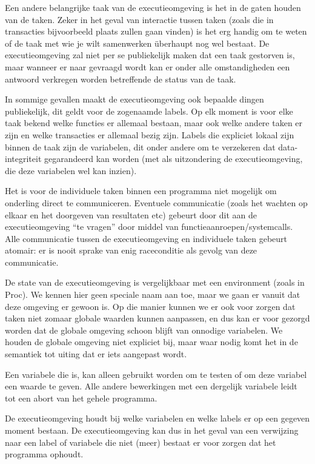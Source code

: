 Een andere belangrijke taak van de executieomgeving is het in de gaten houden van de taken. Zeker in het geval van
interactie tussen taken (zoals die in transacties bijvoorbeeld plaats zullen gaan vinden) is het erg handig om te weten
of de taak met wie je wilt samenwerken \"uberhaupt nog wel bestaat. De executieomgeving zal niet per se publiekelijk
maken dat een taak gestorven is, maar wanneer er naar gevraagd wordt kan er onder alle omstandigheden een antwoord
verkregen worden betreffende de status van de taak.

In sommige gevallen maakt de executieomgeving ook bepaalde dingen publiekelijk, dit geldt voor de zogenaamde labels. Op
elk moment is voor elke taak bekend welke functies er allemaal bestaan, maar ook welke andere taken er zijn en welke
transacties er allemaal bezig zijn. Labels die expliciet lokaal zijn binnen de taak zijn de variabelen, dit onder
andere om te verzekeren dat data-integriteit gegarandeerd kan worden (met als uitzondering de executieomgeving, die deze
variabelen wel kan inzien).

Het is voor de individuele taken binnen een programma niet mogelijk om onderling direct te communiceren. Eventuele
communicatie (zoals het wachten op elkaar en het doorgeven van resultaten etc) gebeurt door dit aan de executieomgeving
``te vragen'' door middel van functieaanroepen/systemcalls. Alle communicatie tussen de executieomgeving en individuele
taken gebeurt atomair: er is nooit sprake van enig raceconditie als gevolg van deze communicatie.

De state van de executieomgeving is vergelijkbaar met een environment (zoals in Proc). We kennen hier geen speciale
naam aan toe, maar we gaan er vanuit dat deze omgeving er gewoon is. Op die manier kunnen we er ook voor zorgen dat
taken niet zomaar globale waarden kunnen aanpassen, en dus kan er voor gezorgd worden dat de globale omgeving schoon
blijft van onnodige variabelen. We houden de globale omgeving niet expliciet bij, maar waar nodig komt het in de
semantiek tot uiting dat er iets aangepast wordt.

Een variabele die  is, kan alleen gebruikt worden om te testen of om deze variabel een waarde te
geven. Alle andere bewerkingen met een dergelijk variabele leidt tot een abort van het gehele programma.

De executieomgeving houdt bij welke variabelen en welke labels er op een gegeven moment bestaan. De
executieomgeving kan dus in het geval van een verwijzing naar een label of variabele die niet (meer) bestaat er voor
zorgen dat het programma ophoudt.

